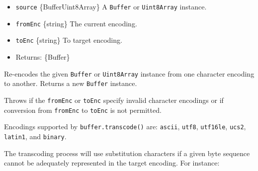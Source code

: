 \begin{itemize}
\tightlist
\item
  \texttt{source} \{Buffer\textbar Uint8Array\} A \texttt{Buffer} or
  \texttt{Uint8Array} instance.
\item
  \texttt{fromEnc} \{string\} The current encoding.
\item
  \texttt{toEnc} \{string\} To target encoding.
\item
  Returns: \{Buffer\}
\end{itemize}

Re-encodes the given \texttt{Buffer} or \texttt{Uint8Array} instance
from one character encoding to another. Returns a new \texttt{Buffer}
instance.

Throws if the \texttt{fromEnc} or \texttt{toEnc} specify invalid
character encodings or if conversion from \texttt{fromEnc} to
\texttt{toEnc} is not permitted.

Encodings supported by \texttt{buffer.transcode()} are:
\texttt{\textquotesingle{}ascii\textquotesingle{}},
\texttt{\textquotesingle{}utf8\textquotesingle{}},
\texttt{\textquotesingle{}utf16le\textquotesingle{}},
\texttt{\textquotesingle{}ucs2\textquotesingle{}},
\texttt{\textquotesingle{}latin1\textquotesingle{}}, and
\texttt{\textquotesingle{}binary\textquotesingle{}}.

The transcoding process will use substitution characters if a given byte
sequence cannot be adequately represented in the target encoding. For
instance:

\begin{Shaded}
\begin{Highlighting}[]
\NormalTok{ \{ }\OperatorTok{,} \OperatorTok{;}

\OperatorTok{=} \NormalTok{(}\NormalTok{(}\NormalTok{)}\OperatorTok{,} \OperatorTok{,} \NormalTok{)}\OperatorTok{;}
\NormalTok{(}\NormalTok{))}\OperatorTok{;}
\end{Highlighting}
\end{Shaded}

